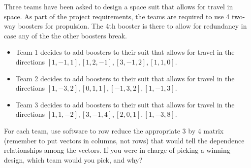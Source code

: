 \begin{problem}
%
Three teams have been asked to design a space suit that allows for travel in space. As part of the project requirements, the teams are required to use 4 two-way boosters for propulsion.  The 4th booster is there to allow for redundancy in case any of the the other boosters break. 
\begin{itemize}
 \item Team 1 decides to add boosters to their suit that allows for travel in the directions 
$[1,-1,1],
[1,2,-1],
[3,-1,2],
[1,1,0]$.
 \item Team 2 decides to add boosters to their suit that allows for travel in the directions 
$[1,-3,2],
[0,1,1],
[-1,3,2],
[1,-1,3]$.
 \item Team 3 decides to add boosters to their suit that allows for travel in the directions
$[1,1,-2],
[3,-1,4],
[2,0,1],
[1,-3,8]$.
\end{itemize}
For each team, use software to row reduce the appropriate 3 by 4 matrix (remember to put vectors in columns, not rows) that would tell the dependence relationships among the vectors. If you were in charge of picking a winning design, which team would you pick, and why?
\end{problem}


\mysubsection{\ideamul}

